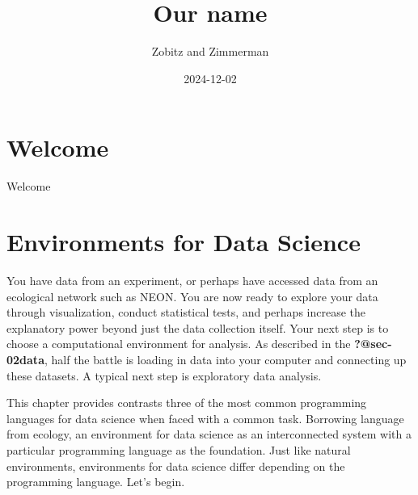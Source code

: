 \documentclass[
  letterpaper,
]{krantz}
\title{Our name}
\author{Zobitz and Zimmerman}
\date{2024-12-02}
\renewcommand*\contentsname{Table of contents}
\newcommand\contentsname{Table of contents}
\begin{document}
\maketitle


\thispagestyle{empty}

\begin{center}
\end{center}

\setlength{\abovedisplayskip}{-5pt}
\setlength{\abovedisplayshortskip}{-5pt}

\renewcommand*\contentsname{Table of contents}
{
\hypersetup{linkcolor=}
\setcounter{tocdepth}{2}
\tableofcontents
}

\chapter*{Welcome}\label{welcome}


Welcome

\mainmatter


\chapter{Environments for Data Science}\label{sec-03environments}

You have data from an experiment, or perhaps have accessed data from an
ecological network such as NEON. You are now ready to explore your data
through visualization, conduct statistical tests, and perhaps increase
the explanatory power beyond just the data collection itself. Your next
step is to choose a computational environment for analysis. As described
in the \textbf{?@sec-02data}, half the battle is loading in data into
your computer and connecting up these datasets. A typical next step is
exploratory data analysis.

This chapter provides contrasts three of the most common programming
languages for data science when faced with a common task. Borrowing
language from ecology, an environment for data science as an
interconnected system with a particular programming language as the
foundation. Just like natural environments, environments for data
science differ depending on the programming language. Let's begin.
\end{document}
